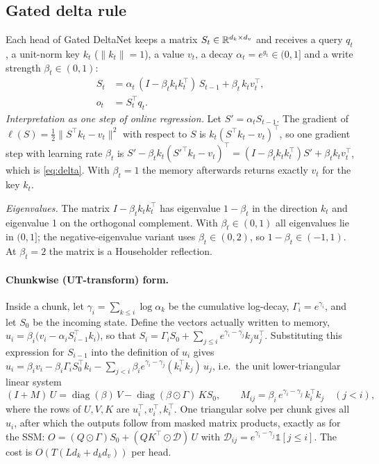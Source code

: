 \subsection{Gated delta rule}
Each head of Gated DeltaNet keeps a matrix $S_t\in\mathbb{R}^{d_k\times d_v}$ and receives a query $q_t$, a unit-norm key
$k_t$ ($\lVert k_t\rVert=1$), a value $v_t$, a decay $\alpha_t=e^{g_t}\in(0,1]$ and a write strength
$\beta_t\in(0,1)$:
\begin{align}
  S_t &= \alpha_t\,(I - \beta_t k_t k_t^\top)\, S_{t-1} + \beta_t\, k_t v_t^\top, \label{eq:delta}\\
  o_t &= S_t^\top q_t . \nonumber
\end{align}
\emph{Interpretation as one step of online regression.} Let $S'=\alpha_t S_{t-1}$. The gradient of
$\ell(S)=\tfrac12\lVert S^\top k_t - v_t\rVert^2$ with respect to $S$ is $k_t(S^\top k_t - v_t)^\top$, so
one gradient step with learning rate $\beta_t$ is
$S' - \beta_t k_t(S'^\top k_t - v_t)^\top = (I-\beta_t k_t k_t^\top)S' + \beta_t k_t v_t^\top$, which is
\eqref{eq:delta}. With $\beta_t=1$ the memory afterwards returns exactly $v_t$ for the key $k_t$.

\emph{Eigenvalues.} The matrix $I-\beta_t k_tk_t^\top$ has eigenvalue $1-\beta_t$ in the direction $k_t$ and
eigenvalue 1 on the orthogonal complement. With $\beta_t\in(0,1)$ all eigenvalues lie in $(0,1]$; the
negative-eigenvalue variant uses $\beta_t\in(0,2)$, so $1-\beta_t\in(-1,1)$. At $\beta_t=2$ the matrix is a
Householder reflection.

\paragraph{Chunkwise (UT-transform) form.} Inside a chunk, let $\gamma_i=\sum_{k\le i}\log\alpha_k$ be the
cumulative log-decay, $\Gamma_i=e^{\gamma_i}$, and let $S_0$ be the incoming state. Define the vectors
actually written to memory, $u_i=\beta_i\big(v_i-\alpha_i S_{i-1}^\top k_i\big)$, so that
$S_i=\Gamma_i S_0+\sum_{j\le i} e^{\gamma_i-\gamma_j}k_j u_j^\top$. Substituting this expression for
$S_{i-1}$ into the definition of $u_i$ gives
$u_i = \beta_i v_i - \beta_i\Gamma_i S_0^\top k_i - \sum_{j<i}\beta_i e^{\gamma_i-\gamma_j}(k_i^\top k_j)\,u_j$,
i.e.\ the unit lower-triangular linear system
\begin{equation}
  (I+M)\,U = \operatorname{diag}(\beta)\,V - \operatorname{diag}(\beta\odot\Gamma)\,K S_0, \qquad
  M_{ij} = \beta_i\, e^{\gamma_i-\gamma_j}\, k_i^\top k_j \quad (j<i),
  \label{eq:ut}
\end{equation}
where the rows of $U,V,K$ are $u_i^\top, v_i^\top, k_i^\top$. One triangular solve per chunk gives all $u_i$,
after which the outputs follow from masked matrix products, exactly as for the SSM:
$O = (Q\odot\Gamma)S_0 + (QK^\top\odot\mathcal{D})\,U$ with $\mathcal{D}_{ij}=e^{\gamma_i-\gamma_j}\mathbb{1}[j\le i]$.
The cost is $O(T(Ld_k + d_kd_v))$ per head.

